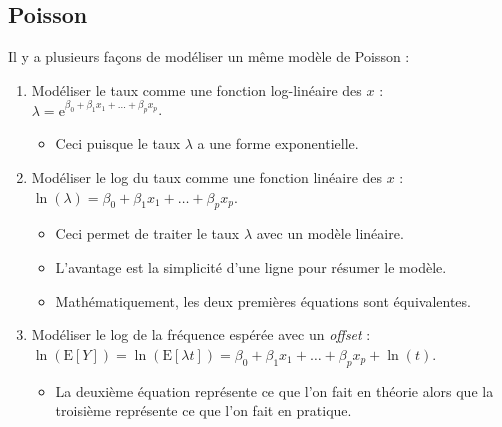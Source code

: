 \documentclass[french]{article}
\begin{document}
\begin{multicols*}{2}
\subsection{Poisson}
Il y a plusieurs façons de modéliser un même modèle de Poisson : 
\begin{enumerate}
	\item	Modéliser le taux comme une fonction log-linéaire des $x$ : $\lambda	=	\textrm{e}^{\beta_{0} + \beta_{1}x_{1} + \dots + \beta_{p}x_{p}}$.
		\begin{itemize}
		\item	Ceci puisque le taux $\lambda$ a une forme exponentielle.
		\end{itemize}
	\item	Modéliser le log du taux comme une fonction linéaire des $x$ : $\ln(\lambda)	=	\beta_{0} + \beta_{1}x_{1} + \dots + \beta_{p}x_{p}$.
		\begin{itemize}
		\item	Ceci permet de traiter le taux $\lambda$ avec un modèle linéaire.
		\item	L'avantage est la simplicité d'une ligne pour résumer le modèle.
		\item	Mathématiquement, les deux premières équations sont équivalentes.
		\end{itemize}
	\item	Modéliser le log de la fréquence espérée avec un \og \textit{offset} \fg{} : $\ln(\text{E}[Y])	=	\ln(\text{E}[\lambda t])	=	\beta_{0} + \beta_{1}x_{1} + \dots + \beta_{p}x_{p}	+	\ln(t)$.
		\begin{itemize}
		\item	La deuxième équation représente ce que l'on fait en théorie alors que la troisième représente ce que l'on fait en pratique.
		\end{itemize}
\end{enumerate}


\end{multicols*}
\end{document}

